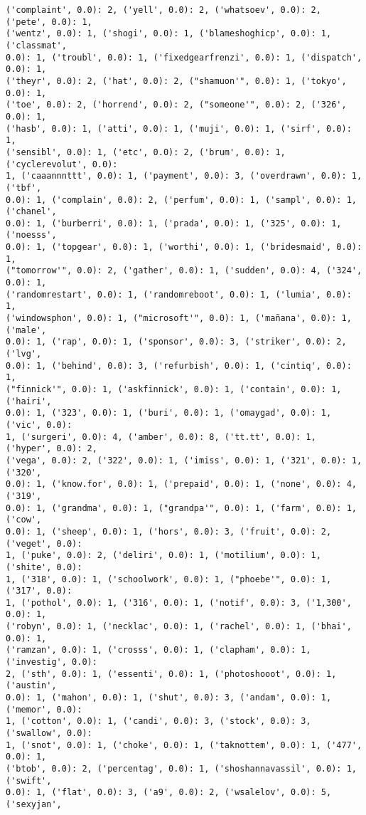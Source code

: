 \documentclass[11pt]{article}
\begin{document}
\begin{Verbatim}[commandchars=\\\{\}]
('complaint', 0.0): 2, ('yell', 0.0): 2, ('whatsoev', 0.0): 2, ('pete', 0.0): 1,
('wentz', 0.0): 1, ('shogi', 0.0): 1, ('blameshoghicp', 0.0): 1, ('classmat',
0.0): 1, ('troubl', 0.0): 1, ('fixedgearfrenzi', 0.0): 1, ('dispatch', 0.0): 1,
('theyr', 0.0): 2, ('hat', 0.0): 2, ("shamuon'", 0.0): 1, ('tokyo', 0.0): 1,
('toe', 0.0): 2, ('horrend', 0.0): 2, ("someone'", 0.0): 2, ('326', 0.0): 1,
('hasb', 0.0): 1, ('atti', 0.0): 1, ('muji', 0.0): 1, ('sirf', 0.0): 1,
('sensibl', 0.0): 1, ('etc', 0.0): 2, ('brum', 0.0): 1, ('cyclerevolut', 0.0):
1, ('caaannnttt', 0.0): 1, ('payment', 0.0): 3, ('overdrawn', 0.0): 1, ('tbf',
0.0): 1, ('complain', 0.0): 2, ('perfum', 0.0): 1, ('sampl', 0.0): 1, ('chanel',
0.0): 1, ('burberri', 0.0): 1, ('prada', 0.0): 1, ('325', 0.0): 1, ('noesss',
0.0): 1, ('topgear', 0.0): 1, ('worthi', 0.0): 1, ('bridesmaid', 0.0): 1,
("tomorrow'", 0.0): 2, ('gather', 0.0): 1, ('sudden', 0.0): 4, ('324', 0.0): 1,
('randomrestart', 0.0): 1, ('randomreboot', 0.0): 1, ('lumia', 0.0): 1,
('windowsphon', 0.0): 1, ("microsoft'", 0.0): 1, ('mañana', 0.0): 1, ('male',
0.0): 1, ('rap', 0.0): 1, ('sponsor', 0.0): 3, ('striker', 0.0): 2, ('lvg',
0.0): 1, ('behind', 0.0): 3, ('refurbish', 0.0): 1, ('cintiq', 0.0): 1,
("finnick'", 0.0): 1, ('askfinnick', 0.0): 1, ('contain', 0.0): 1, ('hairi',
0.0): 1, ('323', 0.0): 1, ('buri', 0.0): 1, ('omaygad', 0.0): 1, ('vic', 0.0):
1, ('surgeri', 0.0): 4, ('amber', 0.0): 8, ('tt.tt', 0.0): 1, ('hyper', 0.0): 2,
('vega', 0.0): 2, ('322', 0.0): 1, ('imiss', 0.0): 1, ('321', 0.0): 1, ('320',
0.0): 1, ('know.for', 0.0): 1, ('prepaid', 0.0): 1, ('none', 0.0): 4, ('319',
0.0): 1, ('grandma', 0.0): 1, ("grandpa'", 0.0): 1, ('farm', 0.0): 1, ('cow',
0.0): 1, ('sheep', 0.0): 1, ('hors', 0.0): 3, ('fruit', 0.0): 2, ('veget', 0.0):
1, ('puke', 0.0): 2, ('deliri', 0.0): 1, ('motilium', 0.0): 1, ('shite', 0.0):
1, ('318', 0.0): 1, ('schoolwork', 0.0): 1, ("phoebe'", 0.0): 1, ('317', 0.0):
1, ('pothol', 0.0): 1, ('316', 0.0): 1, ('notif', 0.0): 3, ('1,300', 0.0): 1,
('robyn', 0.0): 1, ('necklac', 0.0): 1, ('rachel', 0.0): 1, ('bhai', 0.0): 1,
('ramzan', 0.0): 1, ('crosss', 0.0): 1, ('clapham', 0.0): 1, ('investig', 0.0):
2, ('sth', 0.0): 1, ('essenti', 0.0): 1, ('photoshooot', 0.0): 1, ('austin',
0.0): 1, ('mahon', 0.0): 1, ('shut', 0.0): 3, ('andam', 0.0): 1, ('memor', 0.0):
1, ('cotton', 0.0): 1, ('candi', 0.0): 3, ('stock', 0.0): 3, ('swallow', 0.0):
1, ('snot', 0.0): 1, ('choke', 0.0): 1, ('taknottem', 0.0): 1, ('477', 0.0): 1,
('btob', 0.0): 2, ('percentag', 0.0): 1, ('shoshannavassil', 0.0): 1, ('swift',
0.0): 1, ('flat', 0.0): 3, ('a9', 0.0): 2, ('wsalelov', 0.0): 5, ('sexyjan',

\end{Verbatim}
\end{document}
